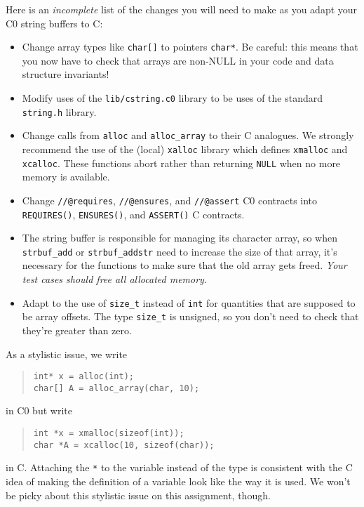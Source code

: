 \documentclass[12pt]{exam}
\begin{document}
Here is an \emph{incomplete} list of the changes you will need to make
as you adapt your C0 string buffers to C:
\begin{itemize}
\item%
  Change array types like \lstinline'char[]' to pointers
  \lstinline'char*'. Be careful: this means that you now have to check
  that arrays are non-NULL in your code and data structure invariants!
\item%
  Modify uses of the \lstinline'lib/cstring.c0' library to be uses of
  the standard \lstinline[deletekeywords={string}]'string.h' library.
\item%
  Change calls from \lstinline'alloc' and \lstinline'alloc_array'
  to their C analogues. We strongly recommend the use of the (local)
  \lstinline'xalloc' library which defines \lstinline'xmalloc' and
  \lstinline'xcalloc'. These functions abort rather than returning
  \lstinline'NULL' when no more memory is available.
\item%
  Change \lstinline'//@requires', \lstinline'//@ensures', and
  \lstinline'//@assert' C0 contracts into \lstinline'REQUIRES()',
  \lstinline'ENSURES()', and \lstinline'ASSERT()' C contracts.
\item%
  The string buffer is responsible for managing its character
  array, so when \lstinline'strbuf_add' or \lstinline'strbuf_addstr' need to
  increase the size of that array, it's necessary for the functions to
  make sure that the old array gets freed. \emph{Your test cases
    should free all allocated memory.}
\item%
  Adapt to the use of \lstinline'size_t' instead of \lstinline'int' for
  quantities that are supposed to be array offsets. The type
  \lstinline'size_t' is unsigned, so you don't need to check that they're
  greater than zero.
\end{itemize}
As a stylistic issue, we write
\begin{quote}
\begin{lstlisting}
int* x = alloc(int);
char[] A = alloc_array(char, 10);
\end{lstlisting}
\end{quote}
in C0 but write
\begin{quote}
\begin{lstlisting}
int *x = xmalloc(sizeof(int));
char *A = xcalloc(10, sizeof(char));
\end{lstlisting}
\end{quote}
in C. Attaching the \lstinline'*' to the variable instead of the type
is consistent with the C idea of making the definition of a variable
look like the way it is used. We won't be picky about this stylistic
issue on this assignment, though.
\end{document}
